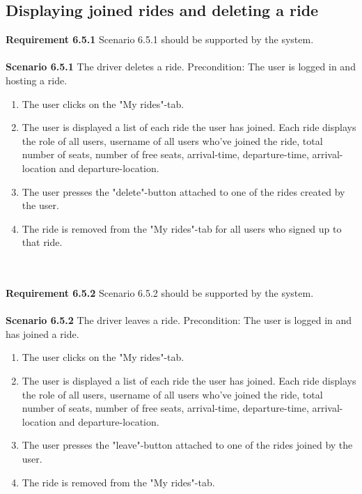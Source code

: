 \documentclass{article}
\begin{document}
\subsection{Displaying joined rides and deleting a ride}
\textbf{Requirement 6.5.1} Scenario 6.5.1 should be supported by the system.
\\ \\
\textbf{Scenario 6.5.1} The driver deletes a ride. Precondition: The user is logged in and hosting a ride.
\begin{enumerate}
    \item The user clicks on the "My rides"-tab.
    \item The user is displayed a list of each ride the user has joined. Each ride displays the role of all users, username of all users who've joined the ride, total number of seats, number of free seats, arrival-time, departure-time, arrival-location and departure-location.
    \item The user presses the "delete"-button attached to one of the rides created by the user.
    \item The ride is removed from the "My rides"-tab for all users who signed up to that ride. 
\end{enumerate} 
\mbox{}\\ \\
\textbf{Requirement 6.5.2} Scenario 6.5.2 should be supported by the system.
\\ \\
\textbf{Scenario 6.5.2} The driver leaves a ride. Precondition: The user is logged in and has joined a ride.
\begin{enumerate}
    \item The user clicks on the "My rides"-tab.
    \item The user is displayed a list of each ride the user has joined. Each ride displays the role of all users, username of all users who've joined the ride, total number of seats, number of free seats, arrival-time, departure-time, arrival-location and departure-location.
    \item The user presses the "leave"-button attached to one of the rides joined by the user.
    \item The ride is removed from the "My rides"-tab.
\end{enumerate} 
\mbox{}\\ \\
\end{document}
